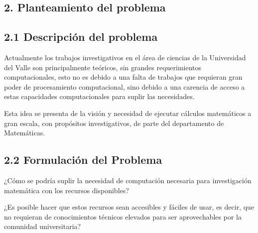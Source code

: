 \begin{doublespace}
\begin{tightcenter}
\section{2. Planteamiento del problema}
\mylinespacing
\end{tightcenter}

\subsection{2.1  Descripción del problema}

Actualmente los trabajos investigativos en el área de ciencias de la Universidad del Valle son principalmente teóricos, sin grandes requerimientos computacionales, esto no es debido a una falta de trabajos que requieran gran poder de procesamiento computacional, sino debido a una carencia de acceso a estas capacidades computacionales para suplir las necesidades.

\vspace{3mm} 

Esta idea se presenta de la visión y necesidad de ejecutar cálculos matemáticos a gran escala, con propósitos investigativos, de parte del departamento de Matemáticas.

\vspace{3mm} 

\subsection{2.2 Formulación del Problema}

¿Cómo se podría suplir la necesidad de computación necesaria para investigación matemática con los recursos disponibles?

\vspace{2mm} 

¿Es posible hacer que estos recursos sean accesibles y fáciles de usar, es decir, que no requieran de conocimientos técnicos elevados para ser aprovechables por la comunidad universitaria?





\mylinespacing
\mylinespacing
\begin{tightcenter}
\end{tightcenter}
\end{doublespace}
